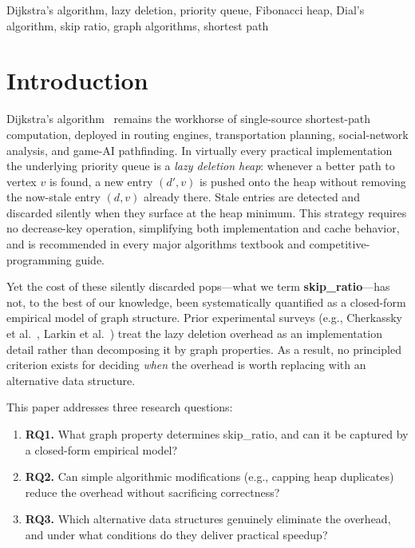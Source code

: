 \documentclass[conference]{IEEEtran}
\begin{document}
\begin{IEEEkeywords}
Dijkstra's algorithm, lazy deletion, priority queue, Fibonacci heap,
Dial's algorithm, skip ratio, graph algorithms, shortest path
\end{IEEEkeywords}

\section{Introduction}

Dijkstra's algorithm~\cite{dijkstra1959} remains the workhorse of
single-source shortest-path computation, deployed in routing engines,
transportation planning, social-network analysis, and game-AI pathfinding.
In virtually every practical implementation the underlying priority queue is
a \emph{lazy deletion heap}: whenever a better path to vertex $v$ is
found, a new entry $(d', v)$ is pushed onto the heap without removing the
now-stale entry $(d, v)$ already there.  Stale entries are detected and
discarded silently when they surface at the heap minimum.  This strategy
requires no decrease-key operation, simplifying both implementation and
cache behavior, and is recommended in every major algorithms textbook and
competitive-programming guide.

Yet the cost of these silently discarded pops---what we term
\textbf{skip\_ratio}---has not, to the best of our knowledge, been
systematically quantified as a closed-form empirical model of graph structure.
Prior experimental surveys (e.g., Cherkassky et al.~\cite{cherkassky1996},
Larkin et al.~\cite{larkin2014}) treat the lazy deletion overhead as an
implementation detail rather than decomposing it by graph properties.
As a result, no principled criterion
exists for deciding \emph{when} the overhead is worth replacing with an
alternative data structure.

This paper addresses three research questions:
\begin{enumerate}
  \item \textbf{RQ1.} What graph property determines skip\_ratio, and can
        it be captured by a closed-form empirical model?
  \item \textbf{RQ2.} Can simple algorithmic modifications (e.g., capping
        heap duplicates) reduce the overhead without sacrificing correctness?
  \item \textbf{RQ3.} Which alternative data structures genuinely eliminate
        the overhead, and under what conditions do they deliver practical speedup?
\end{enumerate}
\end{document}
